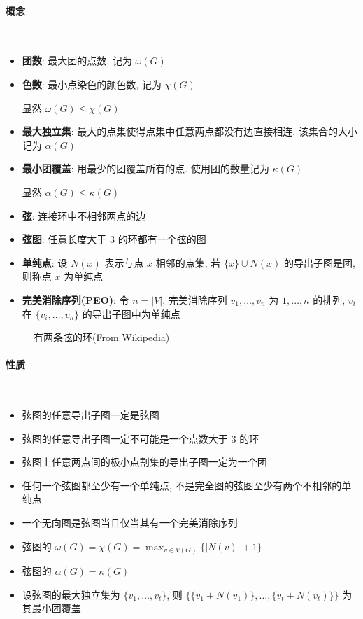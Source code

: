 \paragraph{概念}~\\

\begin{itemize}
    \item \textbf{团数}: 最大团的点数, 记为 \(\omega(G)\)
    \item \textbf{色数}: 最小点染色的颜色数, 记为 \(\chi(G)\)

          显然 \(\omega(G)\le\chi(G)\)

    \item \textbf{最大独立集}: 最大的点集使得点集中任意两点都没有边直接相连. 该集合的大小记为 \(\alpha(G)\)
    \item \textbf{最小团覆盖}: 用最少的团覆盖所有的点. 使用团的数量记为 \(\kappa(G)\)

          显然 \(\alpha(G)\le\kappa(G)\)

    \item \textbf{弦}: 连接环中不相邻两点的边
    \item \textbf{弦图}: 任意长度大于 \(3\) 的环都有一个弦的图
    \item \textbf{单纯点}: 设 \(N(x)\) 表示与点 \(x\) 相邻的点集, 若 \(\{x\}\cup N(x)\) 的导出子图是团, 则称点 \(x\) 为单纯点
    \item \textbf{完美消除序列(PEO)}: 令 \(n=|V|\), 完美消除序列 \(v_1,\dots,v_n\) 为 \(1,\dots,n\) 的排列, \(v_i\) 在 \(\{v_i,\dots,v_n\}\) 的导出子图中为单纯点
\end{itemize}

\begin{figure}[h]
    \label{img:c5-with-2-chords}
    \centering
    
    \caption{有两条弦的环(From Wikipedia)}
\end{figure}

\paragraph{性质}~\\

\begin{itemize}
    \item 弦图的任意导出子图一定是弦图
    \item 弦图的任意导出子图一定不可能是一个点数大于 \(3\) 的环
    \item 弦图上任意两点间的极小点割集的导出子图一定为一个团
    \item 任何一个弦图都至少有一个单纯点, 不是完全图的弦图至少有两个不相邻的单纯点
    \item 一个无向图是弦图当且仅当其有一个完美消除序列
    \item 弦图的 \(\omega(G)=\chi(G)=\max_{v\in V(G)}\{|N(v)|+1\}\)
    \item 弦图的 \(\alpha(G)=\kappa(G)\)
    \item 设弦图的最大独立集为 \(\{v_1,\dots,v_t\}\), 则 \(\{\{v_1+N(v_1)\},\dots,\{v_t+N(v_t)\} \}\) 为其最小团覆盖
\end{itemize}

